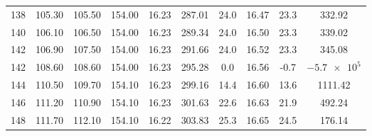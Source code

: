 \begin{table}[H]
\begin{adjustbox}{width=1.2\textwidth, center}
\begin{tabular}{S S[table-format=3.2] S[table-format=3.2] S[table-format=3.2] S[table-format=2.2] S[table-format=3.2] S[table-format=2.1] S[table-format=2.2] S[table-format=3.2] S[table-format=4.2]}
			138                & 105.30              & 105.50              & 154.00                   & 16.23            & 287.01             & 24.0                             & 16.47                                & 23.3                             & 332.92                      \\
			140                & 106.10              & 106.50              & 154.00                   & 16.23            & 289.34             & 24.0                             & 16.50                                & 23.3                             & 339.02                      \\
			142                & 106.90              & 107.50              & 154.00                   & 16.23            & 291.66             & 24.0                             & 16.52                                & 23.3                             & 345.08                      \\
			142                & 108.60              & 108.60              & 154.00                   & 16.23            & 295.28             & 0.0                              & 16.56                                & -0.7                             & {$\num{-5.7e5}$}            \\
			144                & 110.50              & 109.70              & 154.10                   & 16.23            & 299.16             & 14.4                             & 16.60                                & 13.6                             & 1111.42                     \\
			146                & 111.20              & 110.90              & 154.10                   & 16.23            & 301.63             & 22.6                             & 16.63                                & 21.9                             & 492.24                      \\
			148                & 111.70              & 112.10              & 154.10                   & 16.22            & 303.83             & 25.3                             & 16.65                                & 24.5                             & 176.14                      \\
			\bottomrule
		\end{tabular}
	\end{adjustbox}
\end{table}
\noindent

